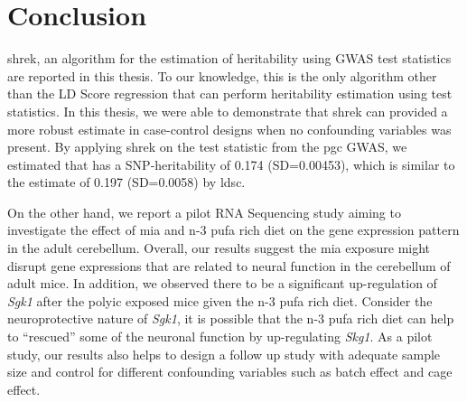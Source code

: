 \documentclass[12pt]{book}
\newcommand*{\glng}{\glsentrylong}
\begin{document}
	
	
	
	\chapter{Conclusion}
	\gls{shrek}, an algorithm for the estimation of heritability using \gls{GWAS} test statistics are reported in this thesis.
	To our knowledge, this is the only algorithm other than the LD Score regression that can perform heritability estimation using test statistics.
	In this thesis, we were able to demonstrate that \gls{shrek} can provided a more robust estimate in case-control designs when no confounding variables was present. 
	By applying \gls{shrek} on the test statistic from the \gls{pgc} \glng{scz} \gls{GWAS}, we estimated that \glng{scz} has a \gls{SNP}-heritability of 0.174 (SD=0.00453), which is similar to the estimate of 0.197 (SD=0.0058) by \gls{ldsc}.
	
	On the other hand, we report a pilot RNA Sequencing study aiming to investigate the effect of \acrfull{mia} and n-3 \gls{pufa} rich diet on the gene expression pattern in the adult cerebellum. 
	Overall, our results suggest the \gls{mia} exposure might disrupt gene expressions that are related to neural function in the cerebellum of adult mice. 
	In addition, we observed there to be a significant up-regulation of \textit{Sgk1} after the \gls{polyic} exposed mice given the n-3 \gls{pufa} rich diet. 
	Consider the neuroprotective nature of \textit{Sgk1}, it is possible that the n-3 \gls{pufa} rich diet can help to ``rescued'' some of the neuronal function by up-regulating \textit{Skg1}.
	As a pilot study, our results also helps to design a follow up study with adequate sample size and control for different confounding variables such as batch effect and cage effect. 
	
\end{document}

